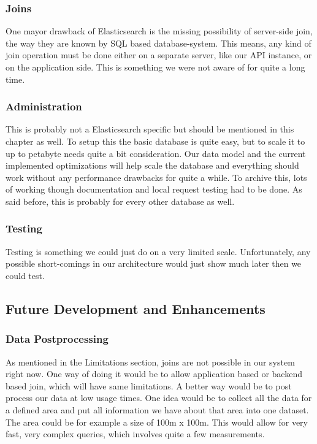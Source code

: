 \subsubsection{Joins}\label{joins}

One mayor drawback of Elasticsearch is the missing possibility of
server-side join, the way they are known by SQL based database-system.
This means, any kind of join operation must be done either on a separate
server, like our API instance, or on the application side. This is
something we were not aware of for quite a long time.

\subsubsection{Administration}\label{administration}

This is probably not a Elasticsearch specific but should be mentioned in
this chapter as well. To setup this the basic database is quite easy,
but to scale it to up to petabyte needs quite a bit consideration. Our
data model and the current implemented optimizations will help scale the
database and everything should work without any performance drawbacks
for quite a while. To archive this, lots of working though documentation
and local request testing had to be done. As said before, this is
probably for every other database as well.

\subsubsection{Testing}\label{testing}

Testing is something we could just do on a very limited scale.
Unfortunately, any possible short-comings in our architecture would just
show much later then we could test.

\subsection{Future Development and
Enhancements}\label{future-development-and-enhancements}

\subsubsection{Data Postprocessing}\label{data-postprocessing}

As mentioned in the Limitations section, joins are not possible in our
system right now. One way of doing it would be to allow application
based or backend based join, which will have same limitations. A better
way would be to post process our data at low usage times. One idea would
be to collect all the data for a defined area and put all information we
have about that area into one dataset. The area could be for example a
size of 100m x 100m. This would allow for very fast, very complex
queries, which involves quite a few measurements.

